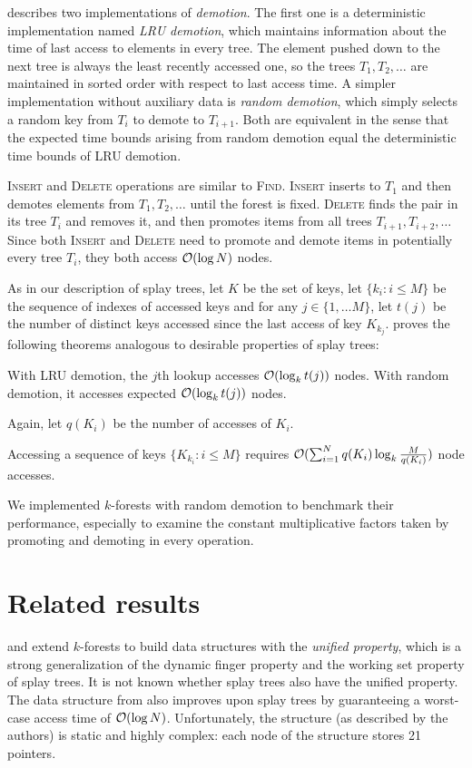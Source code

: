 \cite{martel} describes two implementations of \emph{demotion}.
The first one is a deterministic implementation named \emph{LRU demotion},
which maintains information about the time of last access to elements
in every tree. The element pushed down to the next tree is always the least
recently accessed one, so the trees $T_1,T_2,\ldots$ are maintained in sorted
order with respect to last access time.
A simpler implementation without auxiliary data is \emph{random demotion},
which simply selects a random key from $T_i$ to demote to $T_{i+1}$.
Both are equivalent in the sense that the expected time bounds arising
from random demotion equal the deterministic time bounds of LRU demotion.

\textsc{Insert} and \textsc{Delete} operations are similar to \textsc{Find}.
\textsc{Insert} inserts to $T_1$ and then demotes elements from $T_1,T_2,\ldots$
until the forest is fixed.
\textsc{Delete} finds the pair in its tree $T_i$ and removes it, and
then promotes items from all trees $T_{i+1},T_{i+2},\ldots$
Since both \textsc{Insert} and \textsc{Delete} need to promote and demote items
in potentially every tree $T_i$, they both access $\mathcal{O}(\log N)$ nodes.

As in our description of splay trees, let $K$ be the set of keys,
let $\{k_i: i\leq M\}$ be the sequence of indexes of accessed keys and
for any $j\in\{1,\ldots M\}$, let $t(j)$ be the number of distinct
keys accessed since the last access of key $K_{k_j}$.
\cite{martel} proves the following theorems analogous to desirable properties
of splay trees:
\begin{theorem}
	With LRU demotion, the $j$th lookup accesses $\mathcal{O}(\log_k t(j))$ nodes.
	With random demotion, it accesses expected $\mathcal{O}(\log_k t(j))$ nodes.
\end{theorem}

Again, let $q(K_i)$ be the number of accesses of $K_i$.
\begin{theorem}
	Accessing a sequence of keys $\{K_{k_i}: i\leq M\}$ requires
	$\mathcal{O}(\sum_{i=1}^N q(K_i) \log_k \frac{M}{q(K_i)})$ node accesses.
\end{theorem}

We implemented $k$-forests with random demotion to benchmark their performance,
especially to examine the constant multiplicative factors taken by promoting
and demoting in every operation.

\section{Related results}
\cite{alternatives-to-splay-trees} and \cite{unified-access-bound} extend
$k$-forests to build data structures with the \emph{unified property},
which is a strong generalization of the dynamic finger property and the working
set property of splay trees.
It is not known whether splay trees also have the unified property.
The data structure from \cite{alternatives-to-splay-trees} also improves
upon splay trees by guaranteeing a worst-case access time of $\mathcal{O}(\log N)$.
Unfortunately, the structure (as described by the authors) is static and highly
complex: each node of the structure stores 21 pointers.

